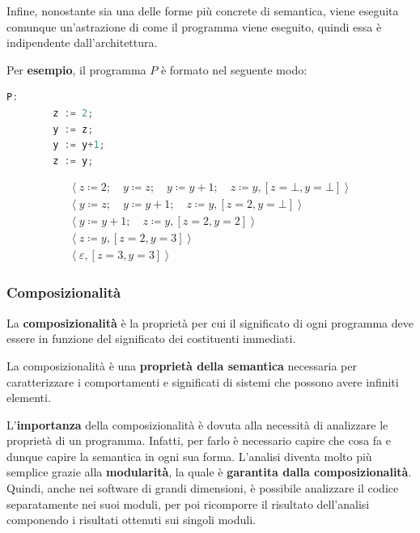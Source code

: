 \documentclass[a4paper]{article}
\begin{document}
	Infine, nonostante sia una delle forme più concrete di semantica, viene eseguita comunque un'astrazione di come il programma viene eseguito, quindi essa è indipendente dall'architettura.\newline
	
	\noindent
	Per \textcolor{Green4}{\textbf{esempio}}, il programma $P$ è formato nel seguente modo:
	\begin{lstlisting}[language=C]
		P:
		z := 2;
		y := z;
		y := y+1;
		z := y;\end{lstlisting}
	\begin{gather*}
		\left\langle z \coloneq 2; \hspace{1em} y \coloneq z; \hspace{1em} y \coloneq y+1; \hspace{1em} z \coloneq y, \left[z=\bot,y=\bot\right]\right\rangle \\
		\left\langle y \coloneq z; \hspace{1em} y \coloneq y+1; \hspace{1em} z \coloneq y, \left[z=2,y=\bot\right]\right\rangle \\		
		\left\langle y \coloneq y+1; \hspace{1em} z \coloneq y, \left[z=2,y=2\right]\right\rangle \\
		\left\langle z \coloneq y, \left[z=2,y=3\right]\right\rangle \\
		\left\langle \varepsilon, \left[z=3,y=3\right]\right\rangle
	\end{gather*}\newpage
	
	\subsubsection{Composizionalità}
	
	La \textcolor{Red3}{\textbf{composizionalità}} è la proprietà per cui il significato di ogni programma deve essere in funzione del significato dei costituenti immediati.\newline
	
	\noindent
	La composizionalità è una \textbf{proprietà della semantica} necessaria per caratterizzare i comportamenti e significati di sistemi che possono avere infiniti elementi.\newline
	
	\noindent
	L'\textbf{importanza} della composizionalità è dovuta alla necessità di analizzare le proprietà di un programma. Infatti, per farlo è necessario capire che cosa fa e dunque capire la semantica in ogni sua forma. L'analisi diventa molto più semplice grazie alla \textbf{modularità}, la quale è \textbf{garantita dalla composizionalità}. Quindi, anche nei software di grandi dimensioni, è possibile analizzare il codice separatamente nei suoi moduli, per poi ricomporre il risultato dell'analisi componendo i risultati ottenuti sui singoli moduli.
	
\end{document}
